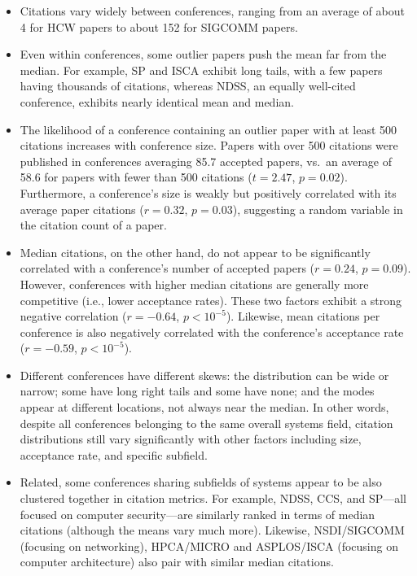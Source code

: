 \documentclass{article}
\providecommand{\tightlist}{%
  \setlength{\itemsep}{0pt}\setlength{\parskip}{0pt}}
\begin{document}
\begin{itemize}
\tightlist
\item
  Citations vary widely between conferences, ranging from an average of about 4 for HCW papers to about 152 for SIGCOMM papers.
\item
  Even within conferences, some outlier papers push the mean far from the median. For example, SP and ISCA exhibit long tails, with a few papers having thousands of citations, whereas NDSS, an equally well-cited conference, exhibits nearly identical mean and median.
\item
  The likelihood of a conference containing an outlier paper with at least 500 citations increases with conference size. Papers with over 500 citations were published in conferences averaging 85.7 accepted papers, vs.~an average of 58.6 for papers with fewer than 500 citations (\(t=2.47\), \(p=0.02\)). Furthermore, a conference's size is weakly but positively correlated with its average paper citations (\(r=0.32\), \(p=0.03\)), suggesting a random variable in the citation count of a paper.
\item
  Median citations, on the other hand, do not appear to be significantly correlated with a conference's number of accepted papers (\(r=0.24\), \(p=0.09\)). However, conferences with higher median citations are generally more competitive (i.e., lower acceptance rates). These two factors exhibit a strong negative correlation (\(r=-0.64\), \(p<10^{-5}\)). Likewise, mean citations per conference is also negatively correlated with the conference's acceptance rate (\(r=-0.59\), \(p<10^{-5}\)).
\item
  Different conferences have different skews: the distribution can be wide or narrow; some have long right tails and some have none; and the modes appear at different locations, not always near the median. In other words, despite all conferences belonging to the same overall systems field, citation distributions still vary significantly with other factors including size, acceptance rate, and specific subfield.
\item
  Related, some conferences sharing subfields of systems appear to be also clustered together in citation metrics. For example, NDSS, CCS, and SP---all focused on computer security---are similarly ranked in terms of median citations (although the means vary much more). Likewise, NSDI/SIGCOMM (focusing on networking), HPCA/MICRO and ASPLOS/ISCA (focusing on computer architecture) also pair with similar median citations.
\end{itemize}
\end{document}
